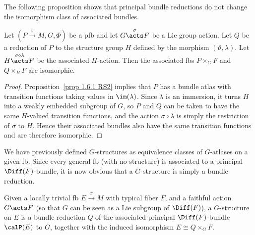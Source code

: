 The following proposition shows that principal bundle reductions do not change the isomorphism class of associated bundles.

\begin{prop}[{{\cite[Prop.~1.6.7]{RS2}}}]\label{prop 1.6.7 RS2}
    Let $(P\overset{\pi}{\to}M, G,\Phi)$ be a \gls{pfb} and let $G\overset{\sigma}{\acts}F$ be a Lie group action. Let $Q$ be a reduction of $P$ to the structure group $H$ defined by the morphism $(\vartheta,\lambda)$. Let $H\overset{\sigma\circ\lambda}{\acts}F$ be the associated $H$-action. Then the associated \glspl{fb} $P\times_G F$ and $Q\times_H F$ are isomorphic.
\end{prop}
\begin{proof}
    Proposition~\ref{prop 1.6.1 RS2} implies that $P$ has a bundle atlas with transition functions taking values in $\im(\lambda)$. Since $\lambda$ is an immersion, it turns $H$ into a weakly embedded subgroup of $G$, so $P$ and $Q$ can be taken to have the same $H$-valued transition functions, and the action $\sigma\circ\lambda$ is simply the restriction of $\sigma$ to $H$. Hence their associated bundles also have the same transition functions and are therefore isomorphic.
\end{proof}

We have previously defined $G$-structures as equivalence classes of $G$-atlases on a given \gls{fb}. Since every general \gls{fb} (with no structure) is associated to a principal $\Diff(F)$-bundle, it is now obvious that a $G$-structure is simply a bundle reduction.

\begin{defn}[$G$-structure]
    Given a locally trivial \gls{fb} $E\overset{\pi}{\to}M$ with typical fiber $F$, and a faithful action $G\acts F$ (so that $G$ can be seen as a Lie subgroup of $\Diff(F)$), a $G$-structure on $E$ is a bundle reduction $Q$ of the associated principal $\Diff(F)$-bundle $\calP(E)$ to $G$, together with the induced isomorphism $E\cong Q\times_G F$. 
\end{defn}

